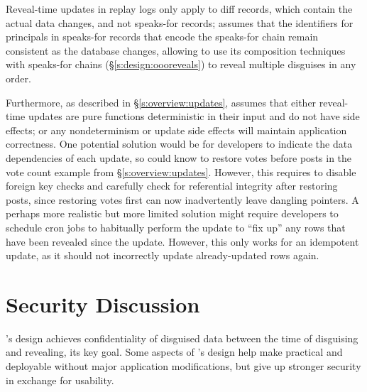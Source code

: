 %
Reveal-time updates in replay logs only apply to diff records, which contain the actual
data changes, and not speaks-for records; \sys assumes that the identifiers for
principals in speaks-for records that encode the speaks-for chain remain
consistent as the database changes, allowing \sys to use its composition
techniques with speaks-for chains (\S\ref{s:design:oooreveals}) to reveal
multiple disguises in any order.
%

%
Furthermore, as described in \S\ref{s:overview:updates}, \sys assumes that
either \one{} reveal-time updates are pure functions deterministic in their input and do not
have side effects; or \two{} any nondeterminism or update side effects will
maintain application correctness.
%
One potential solution would be for developers to indicate the data dependencies
of each update, so \sys could know to \eg restore votes before posts in the
vote count example from \S\ref{s:overview:updates}. However, this
requires \sys to disable foreign key checks and carefully check for referential
integrity after restoring posts, since restoring votes first can now
inadvertently leave dangling pointers. 
%
A perhaps more realistic but more limited solution might require developers to
schedule cron jobs to habitually perform the update to ``fix up'' any rows that
have been revealed since the update. However, this only works for an idempotent
update, as it should not incorrectly update already-updated rows again.  
%


\section{Security Discussion}
\label{s:eval-security}


%
%
\sys's design achieves confidentiality of disguised data between the time of
disguising and revealing, its key goal.
%
Some aspects of \sys's design help make \sys practical and deployable without
major application modifications, but give up stronger security in exchange for
usability.
%


